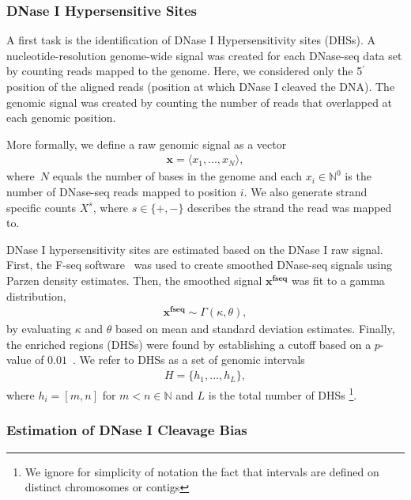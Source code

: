 \documentclass[11pt]{article}
\begin{document}
\subsubsection{DNase I Hypersensitive Sites}
\label{sec:signal}

A first task is the identification of DNase I Hypersensitivity sites (DHSs). A nucleotide-resolution genome-wide signal was created for each DNase-seq data set by counting reads mapped to the genome. Here, we considered only the 5$^\prime$ position of the aligned reads (position at which DNase I cleaved the DNA). The genomic signal was created by counting the number of reads that overlapped at each genomic position.

More formally, we define a raw genomic signal as a vector
\begin{align*}
  \mathbf{x} = \langle{x}_{1},...,{x}_{N}\rangle,
\end{align*}
where~$N$ equals the number of bases in the genome and each ${x}_{i} \in \mathbb{N}^0$ is the number of DNase-seq reads mapped to position $i$. We also generate strand specific counts $X^s$, where $s \in \{+,-\}$ describes the strand the read was mapped to.

DNase I hypersensitivity sites are estimated based on the DNase I raw signal. First, the F-seq software~\citep{boyle2008b} was used to create smoothed DNase-seq signals using Parzen density estimates. Then, the smoothed signal $\mathbf{x^\text{fseq}}$ was fit to a gamma distribution,
\begin{align*}
  \mathbf{x^\text{fseq}} \sim \Gamma(\kappa,\theta),
\end{align*}
by evaluating $\kappa$ and $\theta$ based on mean and standard deviation estimates. Finally, the enriched regions (DHSs) were found by establishing a cutoff based on a $p$-value of $0.01$~\citep{boyle2008b}. We refer to DHSs as a set of genomic intervals
\begin{align*}
  H = \{{h}_{1}, ..., {h}_{L}\},
\end{align*}
where ${h}_{i} = [m,n]$ for $m<n \in \mathbb{N}$ and $L$ is the total number of DHSs \footnote{We ignore for simplicity of notation the fact that intervals are defined on distinct chromosomes or contigs}.

\subsubsection{Estimation of DNase I Cleavage Bias}
\label{sec:bias-estimation}
\end{document}
